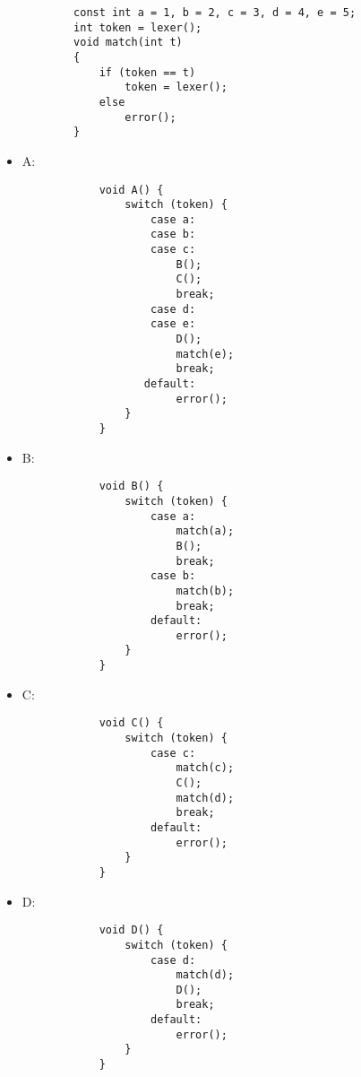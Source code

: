 \documentclass[12pt, A4]{article}
\begin{document}
	\begin{itemize}
        \begin{verbatim}
        const int a = 1, b = 2, c = 3, d = 4, e = 5;
        int token = lexer();
        void match(int t)
        {
            if (token == t)
                token = lexer();
            else
                error();
        }
        \end{verbatim}
        
		\item A: 
			\begin{verbatim}
            void A() {
                switch (token) {
                    case a:
                    case b:
                    case c:
                        B();
                        C();
                        break;
                    case d:
                    case e:
                        D();
                        match(e);
                        break;
                   default:
                        error();
                }
            }
			\end{verbatim}
        \newpage
		\item B:
            \begin{verbatim}
            void B() {
                switch (token) {
                    case a:
                        match(a);
                        B();
                        break;
                    case b:
                        match(b);
                        break;
                    default:
                        error();
                }
            }
            \end{verbatim}
		\item C:
            \begin{verbatim}
            void C() {
                switch (token) {
                    case c:
                        match(c);
                        C();
                        match(d);
                        break;
                    default:
                        error();
                }
            }
            \end{verbatim}
        \newpage
		\item D:
            \begin{verbatim}
            void D() {
                switch (token) {
                    case d:
                        match(d);
                        D();
                        break;
                    default:
                        error();
                }
            }
            \end{verbatim}
	\end{itemize}
	
\end{document}
